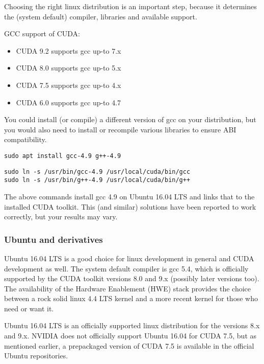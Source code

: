\hspace{4mm}Choosing the right linux distribution is an important step, because it determines the (system default) compiler, libraries and available support.\vspace{5mm}

\noindent GCC support of CUDA:

\begin{itemize}
    \item CUDA 9.2 supports gcc up-to 7.x
    \item CUDA 8.0 supports gcc up-to 5.x
    \item CUDA 7.5 supports gcc up-to 4.x
    \item CUDA 6.0 supports gcc up-to 4.7
\end{itemize}

You could install (or compile) a different version of gcc on your distribution, but you would also need to install or recompile various libraries to ensure ABI compatibility.\vspace{5mm}

\noindent \texttt{sudo apt install gcc-4.9 g++-4.9}\vspace{4mm}
    
\noindent \texttt{sudo ln -s /usr/bin/gcc-4.9 /usr/local/cuda/bin/gcc}\\
\texttt{sudo ln -s /usr/bin/g++-4.9 /usr/local/cuda/bin/g++}\vspace{5mm}

The above commands install gcc 4.9 on Ubuntu 16.04 LTS and links that to the installed CUDA toolkit. This (and similar) solutions have been reported to work correctly, but your results may vary.

\subsubsection*{Ubuntu and derivatives}

\hspace{4mm}Ubuntu 16.04 LTS is a good choice for linux development in general and CUDA development as well. The system default compiler is gcc 5.4, which is officially supported by the CUDA toolkit versions 8.0 and 9.x (possibly later versions too). The availability of the Hardware Enablement (HWE) stack provides the choice between a rock solid linux 4.4 LTS kernel and a more recent kernel for those who need or want it.\vspace{5mm}

Ubuntu 16.04 LTS is an officially supported linux distribution for the versions 8.x and 9.x. NVIDIA does not officially support Ubuntu 16.04 for CUDA 7.5, but as mentioned earlier, a prepackaged version of CUDA 7.5 is available in the official Ubuntu repositories.\vspace{5mm}

